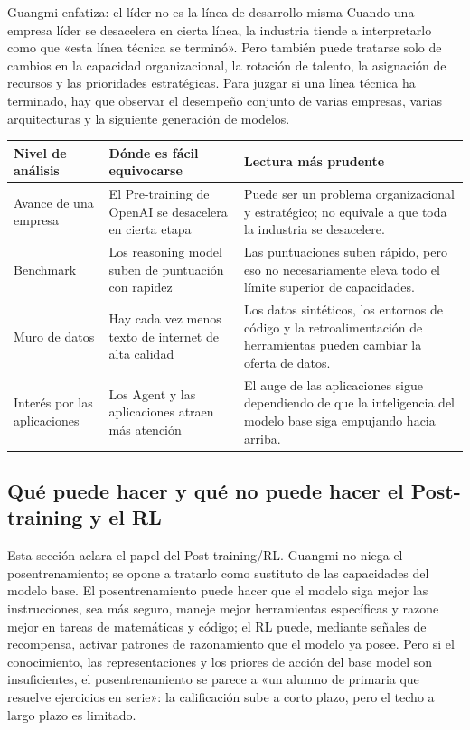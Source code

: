 \begin{importantbox}{Guangmi enfatiza: el líder no es la línea de desarrollo misma}
Cuando una empresa líder se desacelera en cierta línea, la industria tiende a interpretarlo como que «esta línea técnica se terminó». Pero también puede tratarse solo de cambios en la capacidad organizacional, la rotación de talento, la asignación de recursos y las prioridades estratégicas. Para juzgar si una línea técnica ha terminado, hay que observar el desempeño conjunto de varias empresas, varias arquitecturas y la siguiente generación de modelos.
\end{importantbox}

\noindent\begin{tabularx}{\textwidth}{p{}p{}X}
\toprule
Nivel de análisis & Dónde es fácil equivocarse & Lectura más prudente \\
\midrule
Avance de una empresa & El Pre-training de OpenAI se desacelera en cierta etapa & Puede ser un problema organizacional y estratégico; no equivale a que toda la industria se desacelere. \\
Benchmark & Los reasoning model suben de puntuación con rapidez & Las puntuaciones suben rápido, pero eso no necesariamente eleva todo el límite superior de capacidades. \\
Muro de datos & Hay cada vez menos texto de internet de alta calidad & Los datos sintéticos, los entornos de código y la retroalimentación de herramientas pueden cambiar la oferta de datos. \\
Interés por las aplicaciones & Los Agent y las aplicaciones atraen más atención & El auge de las aplicaciones sigue dependiendo de que la inteligencia del modelo base siga empujando hacia arriba. \\
\bottomrule
\end{tabularx}

\subsection{Qué puede hacer y qué no puede hacer el Post-training y el RL}

Esta sección aclara el papel del Post-training/RL. Guangmi no niega el posentrenamiento; se opone a tratarlo como sustituto de las capacidades del modelo base. El posentrenamiento puede hacer que el modelo siga mejor las instrucciones, sea más seguro, maneje mejor herramientas específicas y razone mejor en tareas de matemáticas y código; el RL puede, mediante señales de recompensa, activar patrones de razonamiento que el modelo ya posee. Pero si el conocimiento, las representaciones y los priores de acción del base model son insuficientes, el posentrenamiento se parece a «un alumno de primaria que resuelve ejercicios en serie»: la calificación sube a corto plazo, pero el techo a largo plazo es limitado.

